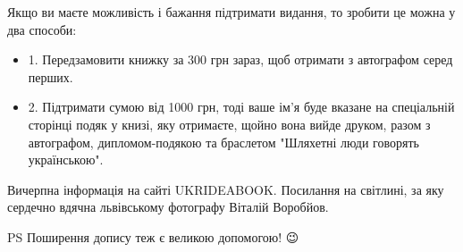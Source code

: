 Якщо ви маєте можливість і бажання підтримати видання, то зробити це можна у
два способи:

\begin{itemize}
\item 1. Передзамовити книжку за 300 грн зараз, щоб отримати з автографом серед перших.
\item 2. Підтримати сумою від 1000 грн, тоді ваше ім'я буде вказане на спеціальній сторінці подяк у книзі, яку отримаєте, щойно вона вийде друком, разом з автографом, дипломом-подякою та браслетом "Шляхетні люди говорять українською".
\end{itemize}

Вичерпна інформація на сайті UKRIDEABOOK. Посилання на світлині, за яку
сердечно вдячна львівському фотографу Віталій Воробйов.

PS Поширення допису теж є великою допомогою! 😉
